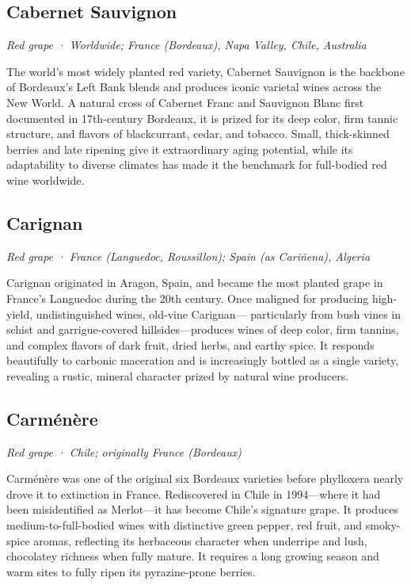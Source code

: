 \subsection*{Cabernet Sauvignon}
\textit{Red grape · Worldwide; France (Bordeaux), Napa Valley, Chile, Australia}\par\smallskip

The world’s most widely planted red variety, Cabernet Sauvignon is the backbone of Bordeaux’s Left Bank blends and produces iconic varietal wines across the New World. A natural cross of Cabernet Franc and Sauvignon Blanc first documented in 17th-century Bordeaux, it is prized for its deep color, firm tannic structure, and flavors of blackcurrant, cedar, and tobacco. Small, thick-skinned berries and late ripening give it extraordinary aging potential, while its adaptability to diverse climates has made it the benchmark for full-bodied red wine worldwide.

\subsection*{Carignan}
\textit{Red grape · France (Languedoc, Roussillon); Spain (as Cariñena), Algeria}\par\smallskip

Carignan originated in Aragon, Spain, and became the most planted grape in France’s Languedoc during the 20th century. Once maligned for producing high-yield, undistinguished wines, old-vine Carignan— particularly from bush vines in schist and garrigue-covered hillsides—produces wines of deep color, firm tannins, and complex flavors of dark fruit, dried herbs, and earthy spice. It responds beautifully to carbonic maceration and is increasingly bottled as a single variety, revealing a rustic, mineral character prized by natural wine producers.

\subsection*{Carménère}
\textit{Red grape · Chile; originally France (Bordeaux)}\par\smallskip

Carménère was one of the original six Bordeaux varieties before phylloxera nearly drove it to extinction in France. Rediscovered in Chile in 1994—where it had been misidentified as Merlot—it has become Chile’s signature grape. It produces medium-to-full-bodied wines with distinctive green pepper, red fruit, and smoky-spice aromas, reflecting its herbaceous character when underripe and lush, chocolatey richness when fully mature. It requires a long growing season and warm sites to fully ripen its pyrazine-prone berries.

